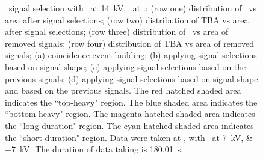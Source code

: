 \begin{landscape}
\begin{figure}[!p]
\begin{subfigure}[t]{0.33\textwidth}
			\caption{}
			\label{fig:signal selection dv 14 04}
		\end{subfigure}
		\caption[\gtest\ signal selection with \opdv\ at \SI{14}{\kV}, \opgd\ at \standarddensity .]{\gtest\ signal selection with \opdv\ at \SI{14}{\kV}, \opgd\ at \standarddensity .: 
			(row one) distribution of \rpdshort\ vs area after signal selections;
			(row two) distribution of TBA vs area after signal selections;
			(row three) distribution of \rpdshort\ vs area of removed signals;
			(row four) distribution of TBA vs area of removed signals;
			(a) coincidence event building; 
			(b) applying signal selections based on signal shape;
			(c) applying signal selections based on the previous signals;
			(d) applying signal selections based on signal shape and based on the previous signals.
			The red hatched shaded area indicates the ``top-heavy" region.
			The blue shaded area indicates the ``bottom-heavy" region.
			The magenta hatched shaded area indicates the ``long duration" region.
			The cyan hatched shaded area indicates the ``short duration" region.
			Data were taken at , with \opvtvb\ at \SIlist{+7;-7}{kV}. The duration of data taking is \SI{180.01}{\s}.
		}
		\label{fig:signal selection dv 14}
	\end{figure}
\end{landscape}
